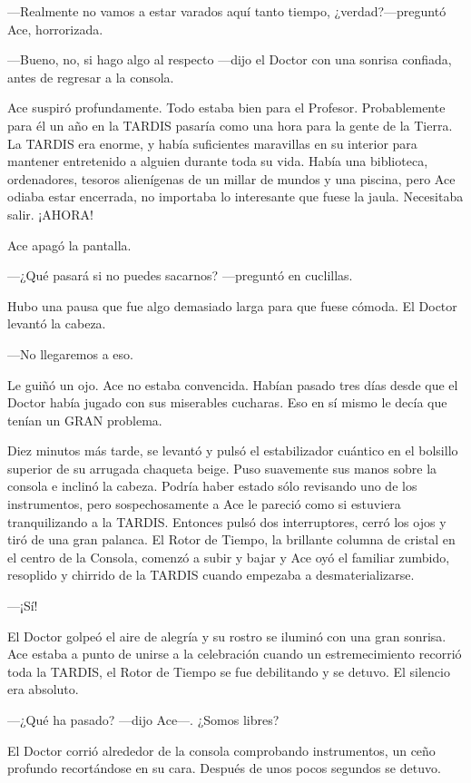 ---Realmente no vamos a estar varados aquí tanto tiempo,
¿verdad?---preguntó Ace, horrorizada.

---Bueno, no, si hago algo al respecto ---dijo el Doctor con una
sonrisa confiada, antes de regresar a la consola.

Ace suspiró profundamente. Todo estaba bien para el Profesor.
Probablemente para él un año en la TARDIS pasaría como una hora para la
gente de la Tierra. La TARDIS era enorme, y había suficientes maravillas
en su interior para mantener entretenido a alguien durante toda su vida.
Había una biblioteca, ordenadores, tesoros alienígenas de un millar de
mundos y una piscina, pero Ace odiaba estar encerrada, no importaba lo
interesante que fuese la jaula. Necesitaba salir. ¡AHORA!

Ace apagó la pantalla.

---¿Qué pasará si no puedes sacarnos? ---preguntó en cuclillas.

Hubo una pausa que fue algo demasiado larga para que fuese
cómoda. El Doctor levantó la cabeza.

---No llegaremos a eso. 

Le guiñó un ojo. Ace no estaba convencida. Habían pasado tres
días desde que el Doctor había jugado con sus miserables cucharas. Eso
en sí mismo le decía que tenían un GRAN problema.

Diez minutos más tarde, se levantó y pulsó el estabilizador
cuántico en el bolsillo superior de su arrugada chaqueta beige. Puso
suavemente sus manos sobre la consola e inclinó la cabeza. Podría haber
estado sólo revisando uno de los instrumentos, pero sospechosamente a
Ace le pareció como si estuviera tranquilizando a la TARDIS. Entonces
pulsó dos interruptores, cerró los ojos y tiró de una gran palanca. El
Rotor de Tiempo, la brillante columna de cristal en el centro de la
Consola, comenzó a subir y bajar y Ace oyó el familiar zumbido,
resoplido y chirrido de la TARDIS cuando empezaba a desmaterializarse.

---¡Sí!

El Doctor golpeó el aire de alegría y su rostro se iluminó con
una gran sonrisa. Ace estaba a punto de unirse a la celebración cuando
un estremecimiento recorrió toda la TARDIS, el Rotor de Tiempo se fue
debilitando y se detuvo. El silencio era absoluto.

---¿Qué ha pasado? ---dijo Ace---. ¿Somos libres?

El Doctor corrió alrededor de la consola comprobando
instrumentos, un ceño profundo recortándose en su cara. Después de unos
pocos segundos se detuvo. 

